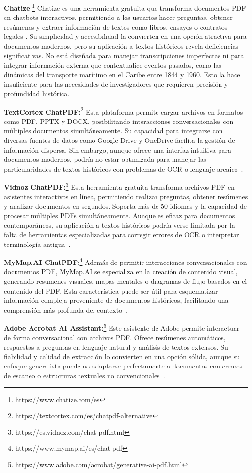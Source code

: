 \textbf{Chatize:}\footnote{https://www.chatize.com/es} Chatize es una herramienta gratuita que transforma documentos PDF en chatbots interactivos, permitiendo a los usuarios hacer preguntas, obtener resúmenes y extraer información de textos como libros, ensayos o contratos legales \cite{chatize2023web}. Su simplicidad y accesibilidad la convierten en una opción atractiva para documentos modernos, pero su aplicación a textos históricos revela deficiencias significativas. No está diseñada para manejar transcripciones imperfectas ni para integrar información externa que contextualice eventos pasados, como las dinámicas del transporte marítimo en el Caribe entre 1844 y 1960. Esto la hace insuficiente para las necesidades de investigadores que requieren precisión y profundidad histórica.

\textbf{TextCortex ChatPDF:}\footnote{https://textcortex.com/es/chatpdf-alternative} Esta plataforma permite cargar archivos en formatos como PDF, PPTX y DOCX, posibilitando interacciones conversacionales con múltiples documentos simultáneamente. Su capacidad para integrarse con diversas fuentes de datos como Google Drive y OneDrive facilita la gestión de información dispersa. Sin embargo, aunque ofrece una interfaz intuitiva para documentos modernos, podría no estar optimizada para manejar las particularidades de textos históricos con problemas de OCR o lenguaje arcaico~\cite{textcortex}.

\textbf{Vidnoz ChatPDF:}\footnote{https://es.vidnoz.com/chat-pdf.html} Esta herramienta gratuita transforma archivos PDF en asistentes interactivos en línea, permitiendo realizar preguntas, obtener resúmenes y analizar documentos en segundos. Soporta más de 50 idiomas y la capacidad de procesar múltiples PDFs simultáneamente. Aunque es eficaz para documentos contemporáneos, su aplicación a textos históricos podría verse limitada por la falta de herramientas especializadas para corregir errores de OCR o interpretar terminología antigua~\cite{vidnoz}.

\textbf{MyMap.AI ChatPDF:}\footnote{https://www.mymap.ai/es/chat-pdf} Además de permitir interacciones conversacionales con documentos PDF, MyMap.AI se especializa en la creación de contenido visual, generando resúmenes visuales, mapas mentales o diagramas de flujo basados en el contenido del PDF. Esta característica puede ser útil para esquematizar información compleja proveniente de documentos históricos, facilitando una comprensión más profunda del contexto~\cite{mymap}.

\textbf{Adobe Acrobat AI Assistant:}\footnote{https://www.adobe.com/acrobat/generative-ai-pdf.html} Este asistente de Adobe permite interactuar de forma conversacional con archivos PDF. Ofrece resúmenes automáticos, respuestas a preguntas en lenguaje natural y análisis de textos extensos. Su fiabilidad y calidad de extracción lo convierten en una opción sólida, aunque su enfoque generalista puede no adaptarse perfectamente a documentos con errores de escaneo o estructuras textuales no convencionales~\cite{acrobatai}.

